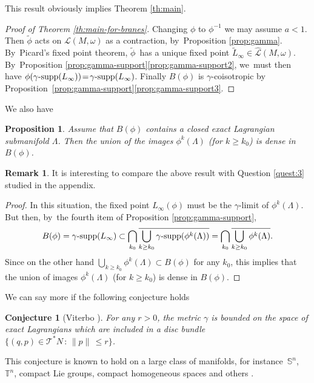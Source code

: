\documentclass[JEP,XML,SOM,Unicode,NoFloatCountersInSection,published]{cedram}
\newtheorem{prop}[thm]{Proposition}
\newtheorem{Conjecture}[thm]{Conjecture}
\theoremstyle{definition}
\newtheorem{rem}[thm]{Remark}
\newcommand {\LL}{{\mathcal L}}
\newcommand{\T}{{\mathcal T}}
\DeclareMathOperator{\gammasupp}{\gamma\textup{-supp}}
\newcommand{\hatLL}{\widehat{\LL}}
\begin{document}
This result obviously implies Theorem \ref{th:main}.

\begin{proof}[Proof of Theorem \ref{th:main-for-branes}]
Changing $\phi$ to $\phi^{-1}$ we may assume $a<1$. Then $\tilde\phi$ acts on $\LL(M, \omega)$ as a contraction, by~Proposition \ref{prop:gamma}. By~Picard's fixed point theorem, $\tilde\phi$~has a unique fixed point $\tilde L_\infty \in
\hatLL(M, \omega)$. By~Proposition \ref{prop:gamma-support}\eqref{prop:gamma-support2}, we~must then have
$\phi(\gammasupp(L_\infty))\!=\! \gammasupp(L_\infty)$. Finally $B(\phi)$ is $\gamma$\nobreakdash-coisotropic by Proposition~\ref{prop:gamma-support}\eqref{prop:gamma-support3}.
\end{proof}

We also have
\begin{prop} \label{prop:lagrangian-in-B}
Assume that $B(\phi)$ contains a closed exact Lagrangian
submanifold $\Lambda$. Then the union of the images $\phi^k(\Lambda)$
(for $k\geq k_0$) is dense in $B(\phi)$.
\end{prop}

\begin{rem}
It is interesting to compare the above result with Question \ref{quest:3} studied in the appendix.
\end{rem}

\begin{proof} In this situation, the fixed point $L_\infty(\phi)$ must be the $\gamma$\nobreakdash-limit of $\phi^k(\Lambda)$. But then, by~the fourth item of Proposition \ref{prop:gamma-support},
\[
B(\phi)=\gammasupp(L_\infty)\subset
\bigcap_{k_0}\overline{\bigcup_{k\geq k_0} \gammasupp(\phi^k(\Lambda))}= \bigcap_{k_0}\overline{\bigcup_{k\geq k_0}\phi^k(\Lambda)}.
\]
Since on the other hand $\bigcup_{k\geq k_0}\phi^k(\Lambda)\subset B(\phi)$ for any $k_0$, this implies that the union of images $\phi^k(\Lambda)$ (for $k\geq k_0$) is dense in $B(\phi)$.
\end{proof}

We can say more if the following conjecture holds

\begin{Conjecture}[Viterbo \cite{SHT}]\label{conj-bounded-Lagrangian}
For any $r>0$, the metric $\gamma$ is bounded on the space of exact Lagrangians which are included in a disc bundle \hbox{$\{(q,p)\!\in\!\T^*N\,{:}\,\|p\|\,\leq\!r\}$}.
\end{Conjecture}

This conjecture is known to hold on a large class of manifolds, for instance~$\mathbb S^n$,~$\mathbb T^n$, compact Lie groups, compact homogeneous spaces and others \cite{Shelukhin-Zoll,shelukhin-sc-viterbo,Guillermou-Vichery, Viterbo-inverse-reduction}.
\end{document}
